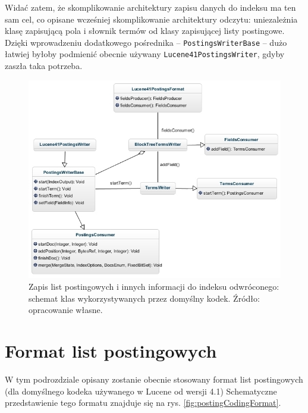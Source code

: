 Widać zatem, że skomplikowanie architektury zapisu danych do indeksu ma ten sam cel, co opisane wcześniej skomplikowanie architektury odczytu: uniezależnia klasę zapisującą pola i słownik termów od klasy zapisującej listy postingowe. Dzięki wprowadzeniu dodatkowego pośrednika -- \texttt{PostingsWriterBase} -- dużo łatwiej byłoby podmienić obecnie używany \texttt{Lucene41PostingsWriter}, gdyby zaszła taka potrzeba.

\begin{figure}[p]
 \includegraphics[scale=0.65]{pictures/Lucene41PostingsFormatWrite_1.jpg}
 \caption{Zapis list postingowych i innych informacji do indeksu odwróconego: schemat klas wykorzystywanych przez domyślny kodek. Źródło: opracowanie własne. \label{fig:postingFormatWrite}}
\end{figure}

\section{Format list postingowych}

W tym podrozdziale opisany zostanie obecnie stosowany format list postingowych (dla domyślnego kodeka używanego w Lucene od wersji 4.1) Schematyczne przedstawienie tego formatu znajduje się na rys. \ref{fig:postingCodingFormat}.

